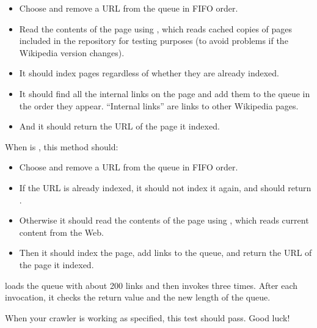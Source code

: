 \documentclass[12pt]{book}
\theoremstyle{exercise}
\begin{document}
\begin{itemize}

\item
  Choose and remove a URL from the queue in FIFO order.

\item
  Read the contents of the page using
  , which reads cached copies of pages
  included in the repository for testing purposes (to avoid
  problems if the Wikipedia version changes).

\item
  It should index pages regardless of whether they are already indexed.

\item
  It should find all the internal links on the page and add them to the
  queue in the order they appear. ``Internal links'' are links to other
  Wikipedia pages.

\item
  And it should return the URL of the page it indexed.

\end{itemize}

When  is , this method should:

\begin{itemize}

\item
  Choose and remove a URL from the queue in FIFO order.

\item
  If the URL is already indexed, it should not index it again, and
  should return .

\item
  Otherwise it should read the contents of the page using
  , which reads current content from
  the Web.

\item
  Then it should index the page, add links to the queue, and return the
  URL of the page it indexed.

\end{itemize}

 loads the queue with about 200 links and then
invokes  three times. After each invocation, it checks the
return value and the new length of the queue.

When your crawler is working as specified, this test should pass. Good
luck!
\end{document}
